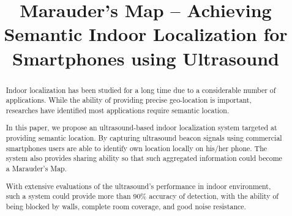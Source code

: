 \documentclass[conference, 10pt]{IEEEtran}
\begin{document}
\title{Marauder's Map -- Achieving Semantic Indoor Localization for Smartphones using Ultrasound}

\author{
\and
{}
\and
{}
}

\maketitle

\begin{abstract}
Indoor localization has been studied for a long time due to a considerable number of applications. While the ability of providing precise geo-location is important, researches have identified most applications require semantic location.

In this paper, we propose an ultrasound-based indoor localization system targeted at providing semantic location. By capturing ultrasound beacon signals using commercial smartphones users are able to identify own location locally on his/her phone. The system also provides sharing ability so that such aggregated information could become a Marauder's Map. 

With extensive evaluations of the ultrasound's performance in indoor environment, such a system could  provide more than 90\% accuracy of detection, with the ability of being blocked by walls, complete room coverage, and good noise resistance. 
\end{abstract}








\end{document}
